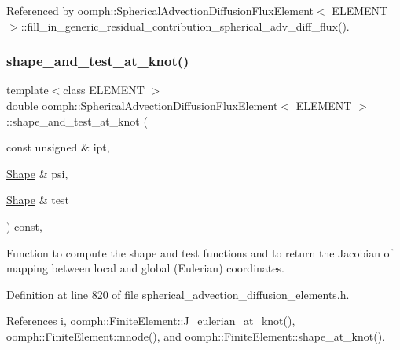 Referenced by oomph\+::\+Spherical\+Advection\+Diffusion\+Flux\+Element$<$ E\+L\+E\+M\+E\+N\+T $>$\+::fill\+\_\+in\+\_\+generic\+\_\+residual\+\_\+contribution\+\_\+spherical\+\_\+adv\+\_\+diff\+\_\+flux().

\mbox{\label{classoomph_1_1SphericalAdvectionDiffusionFluxElement_a34f7cc1f18c22b23e553cc9f0144a48d}} 
\subsubsection{\texorpdfstring{shape\+\_\+and\+\_\+test\+\_\+at\+\_\+knot()}{shape\_and\_test\_at\_knot()}}
{\footnotesize\ttfamily template$<$class E\+L\+E\+M\+E\+NT $>$ \\
double \hyperlink{classoomph_1_1SphericalAdvectionDiffusionFluxElement}{oomph\+::\+Spherical\+Advection\+Diffusion\+Flux\+Element}$<$ E\+L\+E\+M\+E\+NT $>$\+::shape\+\_\+and\+\_\+test\+\_\+at\+\_\+knot (\begin{DoxyParamCaption}\item[{const unsigned \&}]{ipt,  }\item[{\hyperlink{classoomph_1_1Shape}{Shape} \&}]{psi,  }\item[{\hyperlink{classoomph_1_1Shape}{Shape} \&}]{test }\end{DoxyParamCaption}) const\hspace{0.3cm}{\ttfamily [inline]}, {\ttfamily [protected]}}



Function to compute the shape and test functions and to return the Jacobian of mapping between local and global (Eulerian) coordinates. 



Definition at line 820 of file spherical\+\_\+advection\+\_\+diffusion\+\_\+elements.\+h.



References i, oomph\+::\+Finite\+Element\+::\+J\+\_\+eulerian\+\_\+at\+\_\+knot(), oomph\+::\+Finite\+Element\+::nnode(), and oomph\+::\+Finite\+Element\+::shape\+\_\+at\+\_\+knot().


